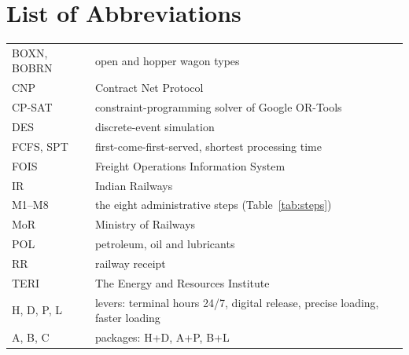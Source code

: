 \documentclass[12pt,a4paper]{report}
\begin{document}
\newpage
\tableofcontents
\newpage
\listoffigures
{}
\listoftables
{}
\newpage
\chapter*{List of Abbreviations}
\begin{tabular}{@{}ll@{}}
BOXN, BOBRN & open and hopper wagon types \\
CNP & Contract Net Protocol \\
CP-SAT & constraint-programming solver of Google OR-Tools \\
DES & discrete-event simulation \\
FCFS, SPT & first-come-first-served, shortest processing time \\
FOIS & Freight Operations Information System \\
IR & Indian Railways \\
M1--M8 & the eight administrative steps (Table~\ref{tab:steps}) \\
MoR & Ministry of Railways \\
POL & petroleum, oil and lubricants \\
RR & railway receipt \\
TERI & The Energy and Resources Institute \\
H, D, P, L & levers: terminal hours 24/7, digital release, precise loading, faster loading \\
A, B, C & packages: H+D, A+P, B+L \\
\end{tabular}
\newpage
{}







\end{document}
